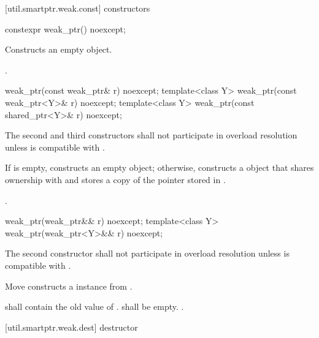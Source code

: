 [util.smartptr.weak.const]{ constructors}

%
\begin{itemdecl}
constexpr weak_ptr() noexcept;
\end{itemdecl}

\begin{itemdescr}
\pnum\effects  Constructs an empty  object.

\pnum\postconditions  {}.
\end{itemdescr}

%
\begin{itemdecl}
weak_ptr(const weak_ptr& r) noexcept;
template<class Y> weak_ptr(const weak_ptr<Y>& r) noexcept;
template<class Y> weak_ptr(const shared_ptr<Y>& r) noexcept;
\end{itemdecl}

\begin{itemdescr}
\pnum\remarks The second and third constructors shall not participate in
overload resolution unless  is compatible with .

\pnum\effects  If  is empty, constructs
an empty  object; otherwise, constructs
a  object that shares ownership
with  and stores a copy of the pointer stored in .

\pnum\postconditions  {}.
\end{itemdescr}

%
\begin{itemdecl}
weak_ptr(weak_ptr&& r) noexcept;
template<class Y> weak_ptr(weak_ptr<Y>&& r) noexcept;
\end{itemdecl}

\begin{itemdescr}
\pnum\remarks The second constructor shall not participate in overload resolution unless
 is compatible with .

\pnum\effects Move constructs a  instance from .

\pnum\postconditions {} shall contain the old value of .
 shall be empty. .
\end{itemdescr}

[util.smartptr.weak.dest]{ destructor}

